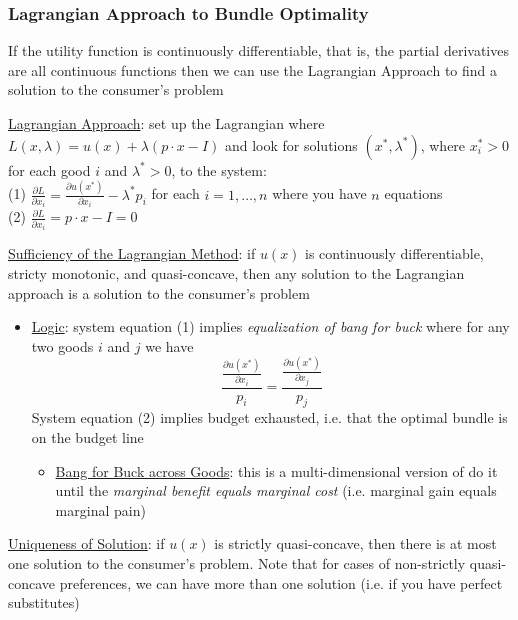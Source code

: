\documentclass{article}
\begin{document}
\subsubsection{Lagrangian Approach to Bundle Optimality}
If the utility function is continuously differentiable, that is, the partial derivatives are all continuous functions then we can use the Lagrangian Approach to find a solution to the consumer's problem \par \vspace{0.3em}
  \underline{Lagrangian Approach}: set up the Lagrangian where $L(x, \lambda) = u(x) + \lambda (p \cdot x - I)$ and look for solutions $(x^{*}, \lambda^{*})$, where $x_{i}^{*} > 0$ for each good $i$ and $\lambda^{*} > 0$, to the system: \\
  (1) $\tfrac{\partial L}{\partial x_{i}} = \tfrac{\partial u(x^{*})}{\partial x_{i}} - \lambda^{*}p_{i}$ \quad for each $i = 1, \dots, n$ where you have $n$ equations \\
  (2) $\tfrac{\partial L}{\partial x_{i}} = p \cdot x - I = 0$
  \par
  \underline{Sufficiency of the Lagrangian Method}: if $u(x)$ is continuously differentiable, stricty monotonic, and quasi-concave, then any solution to the Lagrangian approach is a solution to the consumer's problem
  \begin{itemize}
    \item  \underline{Logic}: system equation (1) implies \textit{equalization of bang for buck} where for any two goods $i$ and $j$ we have $$\frac{\tfrac{\partial u(x^{*})}{\partial x_{i}}}{p_{i}} = \frac{\tfrac{\partial u(x^{*})}{\partial x_{j}}}{p_{j}}$$ System equation (2) implies budget exhausted, i.e. that the optimal bundle is on the budget line
    \begin{itemize}
      \item  \underline{Bang for Buck across Goods}: this is a multi-dimensional version of do it until the \textit{marginal benefit equals marginal cost} (i.e. marginal gain equals marginal pain)
    \end{itemize}
  \end{itemize}
  \par
  \underline{Uniqueness of Solution}: if $u(x)$ is strictly quasi-concave, then there is at most one solution to the consumer's problem. Note that for cases of non-strictly quasi-concave preferences, we can have more than one solution (i.e. if you have perfect substitutes)
\end{document}
